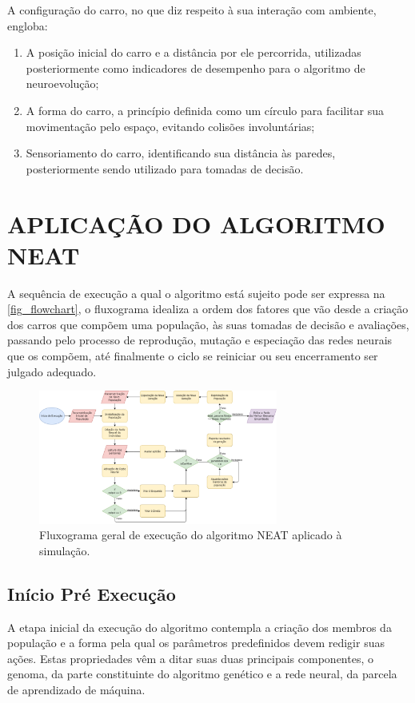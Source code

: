 A configuração do carro, no que diz respeito à sua interação
com ambiente, engloba:

\begin{enumerate}
	\item A posição inicial do carro e a distância por ele percorrida, utilizadas posteriormente como indicadores de desempenho para o algoritmo de neuroevolução;
	\item A forma do carro, a princípio definida como um círculo para facilitar sua movimentação pelo espaço, evitando colisões involuntárias;
	\item Sensoriamento do carro, identificando sua distância às paredes, posteriormente sendo utilizado para tomadas de decisão.
\end{enumerate}


\section{APLICA{\c C}{\~A}O DO ALGORITMO NEAT}
A sequência de execução a qual o algoritmo está sujeito pode ser expressa na \autoref{fig_flowchart}, o fluxograma idealiza a ordem dos fatores que vão desde a criação dos carros que compõem uma população, às suas tomadas de decisão e avaliações, passando pelo processo de reprodução, mutação e especiação das redes neurais que os compõem, até finalmente o ciclo se reiniciar ou seu encerramento ser julgado adequado.

\begin{figure}[htb]
        \centering
        \caption{\label{fig_flowchart}Fluxograma geral de execução do algoritmo NEAT aplicado à simulação.}
        \includegraphics[width=0.7\textwidth]{images/flowchart.png}
\end{figure}

\subsection{Início Pré Execução}
A etapa inicial da execução do algoritmo contempla a criação dos membros da população
e a forma pela qual os parâmetros predefinidos devem redigir suas ações. Estas propriedades
vêm a ditar suas duas principais componentes, o genoma, da parte constituinte do algoritmo
genético e a rede neural, da parcela de aprendizado de máquina.

